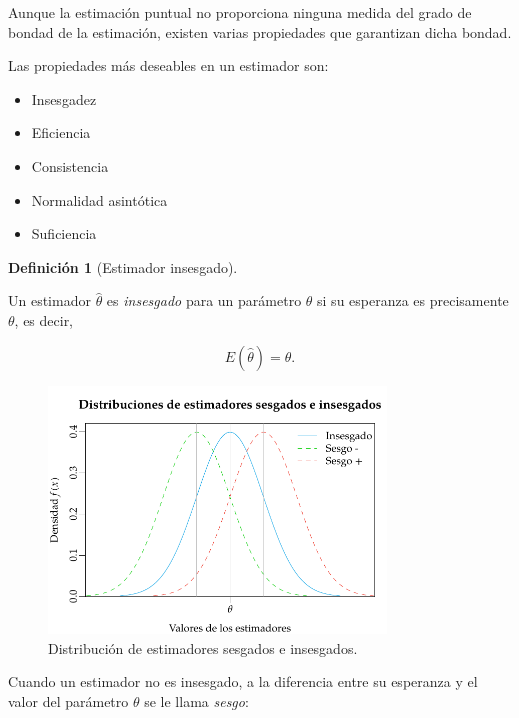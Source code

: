 \documentclass[
  a4paper,
]{scrreport}
\providecommand{\tightlist}{%
  \setlength{\itemsep}{0pt}\setlength{\parskip}{0pt}}\usepackage{longtable,booktabs,array}
\theoremstyle{plain}
\theoremstyle{definition}
\newtheorem{definition}{Definición}[chapter]
\theoremstyle{definition}
\theoremstyle{remark}
\begin{document}
Aunque la estimación puntual no proporciona ninguna medida del grado de
bondad de la estimación, existen varias propiedades que garantizan dicha
bondad.

Las propiedades más deseables en un estimador son:

\begin{itemize}
\tightlist
\item
  Insesgadez
\item
  Eficiencia
\item
  Consistencia
\item
  Normalidad asintótica
\item
  Suficiencia
\end{itemize}

\begin{definition}[Estimador
insesgado]\protect\hypertarget{def-estimador-insesgado}{}\label{def-estimador-insesgado}

Un estimador \(\hat \theta\) es \emph{insesgado} para un parámetro
\(\theta\) si su esperanza es precisamente \(\theta\), es decir,

\[
E(\hat \theta)=\theta.
\]

\end{definition}

\begin{figure}[H]

{\centering \includegraphics[width=0.8\textwidth,height=\textheight]{img/estimacion/estimadores-sesgados-insesgados.pdf}

}

\caption{Distribución de estimadores sesgados e insesgados.}

\end{figure}%

Cuando un estimador no es insesgado, a la diferencia entre su esperanza
y el valor del parámetro \(\theta\) se le llama \emph{sesgo}:
\end{document}
